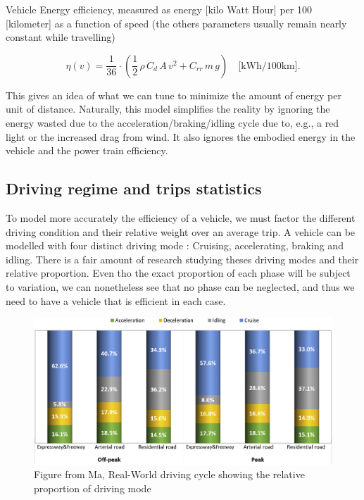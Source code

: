 Vehicle Energy efficiency, measured as energy [kilo Watt Hour] per 100 [kilometer] as a function of speed (the others parameters usually remain nearly constant while travelling)

\begin{equation}
\eta(v) = \frac{1}{36}\cdot\left( \frac{1}{2}\,\rho\,C_d\,A\,v^2 + C_{rr}\,m\,g\right) \quad \text{[kWh/100km]}.
\label{eq:energy_consumption}
\end{equation}


This gives an idea of what we can tune to minimize the amount of energy per unit of distance. Naturally, this model simplifies the reality by ignoring the energy wasted due to the acceleration/braking/idling cycle due to, e.g., a red light or the increased drag from wind. It also ignores the embodied energy in the vehicle and the power train efficiency.

\subsection{Driving regime and trips statistics}

To model more accurately the efficiency of a vehicle, we must factor the different driving condition and their relative weight over an average trip. A vehicle can be modelled with four distinct driving mode : Cruising, accelerating, braking and idling. There is a fair amount of research studying theses driving modes and their relative proportion. Even tho the exact proportion of each phase will be subject to variation, we can nonetheless see that no phase can be neglected, and thus we need to have a vehicle that is efficient in each case.

\begin{figure}[h!]
    \centering
    \includegraphics[width=0.8\linewidth]{Figures/ch2_shareOfDrivingModeChina.jpg}
    \caption{Figure from Ma, Real-World driving cycle\cite{ma_real-world_2019} showing the relative proportion of driving mode}
    \label{fig:ch2proportiondrivingmode}
\end{figure}

